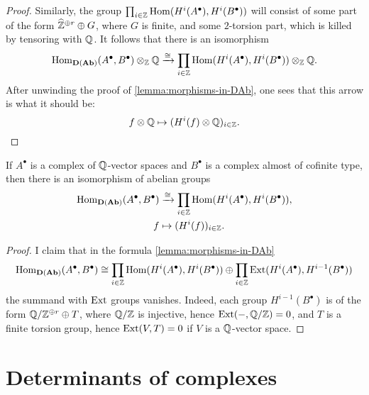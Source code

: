 \begin{observation}
\begin{proof}
    Similarly, the group
    $\prod_{i\in\mathbb{Z}} \operatorname{Hom} (H^i (A^\bullet), H^i (B^\bullet))$ will consist of
    some part of the form $\widehat{\mathbb{Z}}^{\oplus r} \oplus G$, where $G$ is
    finite, and some $2$-torsion part, which is killed by tensoring with
    $\mathbb{Q}$. It follows that there is an isomorphism
    \[ \operatorname{Hom}_{\mathbf{D} (\mathbf{Ab})} (A^\bullet, B^\bullet)\otimes_{\mathbb{Z}} \mathbb{Q} \xrightarrow{\cong}
      \prod_{i\in \mathbb{Z}} \operatorname{Hom} (H^i (A^\bullet), H^i (B^\bullet)) \otimes_{\mathbb{Z}} \mathbb{Q}. \]
    After unwinding the proof of \ref{lemma:morphisms-in-DAb}, one sees that
    this arrow is what it should be:
    $$f\otimes\mathbb{Q} \mapsto (H^i (f) \otimes \mathbb{Q})_{i\in\mathbb{Z}}.$$
  \end{proof}
\end{observation}

\begin{observation}
  \label{obs:morphisms-in-DAb-between-cplx-of-Q-vs-and-almost-cofinite-type-cplx}
  If $A^\bullet$ is a complex of $\mathbb{Q}$-vector spaces and $B^\bullet$ is a complex
  almost of cofinite type, then there is an isomorphism of abelian groups
  \begin{align*}
    \operatorname{Hom}_{\text{\bf D} (\text{\bf Ab})} (A^\bullet, B^\bullet) & \xrightarrow{\cong} \prod_{i\in \mathbb{Z}} \operatorname{Hom} (H^i (A^\bullet), H^i (B^\bullet)),\\
    f & \mapsto (H^i (f))_{i\in \mathbb{Z}}.
  \end{align*}

  \begin{proof}
    I claim that in the formula \ref{lemma:morphisms-in-DAb}
    \[ \operatorname{Hom}_{\text{\bf D} (\text{\bf Ab})} (A^\bullet, B^\bullet) \cong
      \prod_{i\in \mathbb{Z}} \operatorname{Hom} (H^i (A^\bullet), H^i (B^\bullet)) \oplus
      \prod_{i\in \mathbb{Z}} \operatorname{Ext} (H^i (A^\bullet), H^{i-1} (B^\bullet)) \]
    the summand with $\operatorname{Ext}$ groups vanishes. Indeed, each group
    $H^{i-1} (B^\bullet)$ is of the form $\mathbb{Q}/\mathbb{Z}^{\oplus r} \oplus T$, where
    $\mathbb{Q}/\mathbb{Z}$ is injective, hence $\operatorname{Ext} (-,\mathbb{Q}/\mathbb{Z}) = 0$, and $T$ is a finite
    torsion group, hence $\operatorname{Ext} (V, T) = 0$ if $V$ is a $\mathbb{Q}$-vector space.
  \end{proof}
\end{observation}


\section{Determinants of complexes}
\label{section:determinants}

